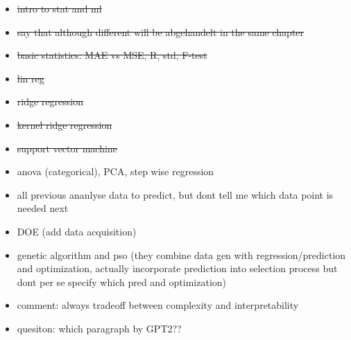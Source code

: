 \begin{itemize}
    \item \sout{intro to stat and ml}
    \item \sout{say that although different will be abgehandelt in the same chapter}
    \item \sout{basic statistics: MAE vs MSE, R, std, F-test} 
    \item \sout{lin reg}
    \item \sout{ridge regression}
    \item \sout{kernel ridge regression}
    \item \sout{support vector machine}
    \item anova (categorical), PCA, step wise regression
    \item all previous ananlyse data to predict, but dont tell me which data point is needed next 
    \item DOE (add data acquisition)
    \item genetic algorithm and pso (they combine data gen with regression/prediction and optimization, actually incorporate prediction into selection process but dont per se specify which pred and optimization)
    \item comment: always tradeoff between complexity and interpretability
    \item quesiton: which paragraph by GPT2?? 
\end{itemize}

